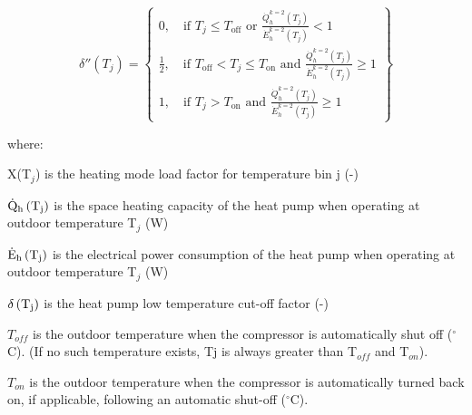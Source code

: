 \begin{equation}
\delta''(T_j) = \left\{
\begin{array}{l}
  0,\quad \text{if~}T_j \le T_{\text{off}} \text{~or~} \frac{\dot{Q}_h^{k = 2}(T_j)}{\dot{E}_h^{k=2}(T_j)} < 1 \\
  \frac{1}{2},\quad \text{if~} T_{\text{off}} < T_j \le T_{\text{on}} \text{~and~}\frac{\dot{Q}_h^{k=2}(T_j)}{\dot{E}_h^{k=2}(T_j)} \ge 1 \\
  1,\quad \text{if~}T_j > T_{\text{on}} \text{~and~} \frac{\dot{Q}_h^{k=2}(T_j)}{\dot{E}_h^{k=2}(T_j)} \ge 1
\end{array} \right\}
\end{equation}

where:

X(T\(_{j}\)) is the heating mode load factor for temperature bin j (-)

\({{\rm{\dot Q}}_{\rm{h}}}\left( {{{\rm{T}}_{\rm{j}}}} \right)\) is the space heating capacity of the heat pump when operating at outdoor temperature T\(_{j}\) (W)

\({{\rm{\dot E}}_{\rm{h}}}\left( {{{\rm{T}}_{\rm{j}}}} \right)\) is the electrical power consumption of the heat pump when operating at outdoor temperature T\(_{j}\) (W)

\({\rm{\delta }}\left( {{{\rm{T}}_{\rm{j}}}} \right)\) is the heat pump low temperature cut-off factor (-)

\(T_{off}\) is the outdoor temperature when the compressor is automatically shut off (\(^{\circ}\)C). (If no such temperature exists, Tj is always greater than T\(_{off}\) and T\(_{on}\)).

\(T_{on}\) is the outdoor temperature when the compressor is automatically turned back on, if applicable, following an automatic shut-off (\(^{\circ}\)C).

